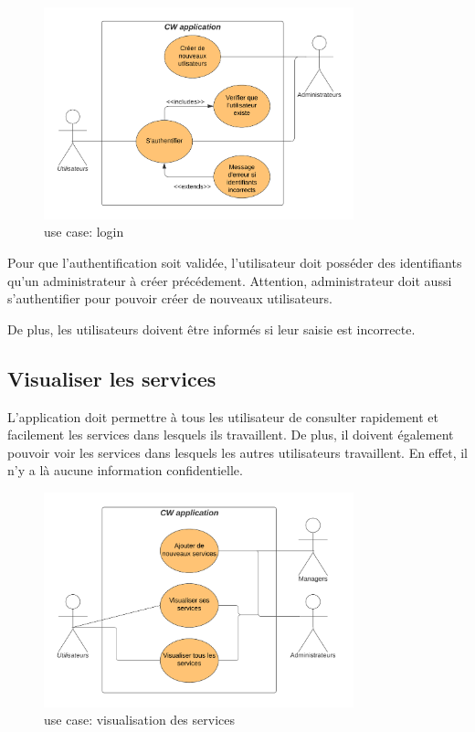 \begin{figure}[!h]
    \begin{center}
        \includegraphics[width= 0.8\textwidth]{uses cases/logginUC.png}
    \end{center}
    \caption{use case: login}
\end{figure}

Pour que l'authentification soit validée, l'utilisateur doit posséder des identifiants qu'un administrateur à créer précédement. Attention, administrateur doit aussi s'authentifier pour pouvoir créer de nouveaux utilisateurs.

De plus, les utilisateurs doivent être informés si leur saisie est incorrecte.

\subsection*{Visualiser les services}
L'application doit permettre à tous les utilisateur de consulter rapidement et facilement les services dans lesquels ils travaillent. De plus, il doivent également pouvoir voir les services dans lesquels les autres utilisateurs travaillent. En effet, il n'y a là aucune information confidentielle.

\begin{figure}[!h]
    \begin{center}
        \includegraphics[width= 0.8\textwidth]{uses cases/visualiser services.png}
    \end{center}
    \caption{use case: visualisation des services}
\end{figure}

